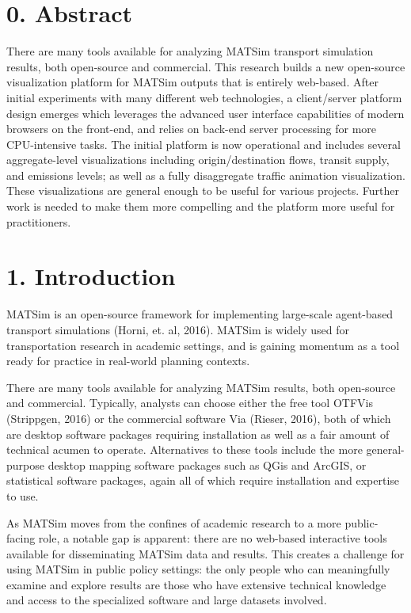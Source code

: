 \hypertarget{mathub-abstract}{%
\section{0. Abstract}\label{mathub-abstract}}

There are many tools available for analyzing MATSim transport simulation
results, both open-source and commercial. This research builds a new
open-source visualization platform for MATSim outputs that is entirely
web-based. After initial experiments with many different web
technologies, a client/server platform design emerges which leverages
the advanced user interface capabilities of modern browsers on the
front-end, and relies on back-end server processing for more
CPU-intensive tasks. The initial platform is now operational and
includes several aggregate-level visualizations including
origin/destination flows, transit supply, and emissions levels; as well
as a fully disaggregate traffic animation visualization. These
visualizations are general enough to be useful for various projects.
Further work is needed to make them more compelling and the platform
more useful for practitioners.

\hypertarget{introduction}{%
\section{1. Introduction}\label{introduction}}

MATSim is an open-source framework for implementing large-scale
agent-based transport simulations (Horni, et. al, 2016). MATSim is
widely used for transportation research in academic settings, and is
gaining momentum as a tool ready for practice in real-world planning
contexts.

There are many tools available for analyzing MATSim results, both
open-source and commercial. Typically, analysts can choose either the
free tool OTFVis (Strippgen, 2016) or the commercial software Via
(Rieser, 2016), both of which are desktop software packages requiring
installation as well as a fair amount of technical acumen to operate.
Alternatives to these tools include the more general-purpose desktop
mapping software packages such as QGis and ArcGIS, or statistical
software packages, again all of which require installation and expertise
to use.

As MATSim moves from the confines of academic research to a more
public-facing role, a notable gap is apparent: there are no web-based
interactive tools available for disseminating MATSim data and results.
This creates a challenge for using MATSim in public policy settings: the
only people who can meaningfully examine and explore results are those
who have extensive technical knowledge and access to the specialized
software and large datasets involved.

